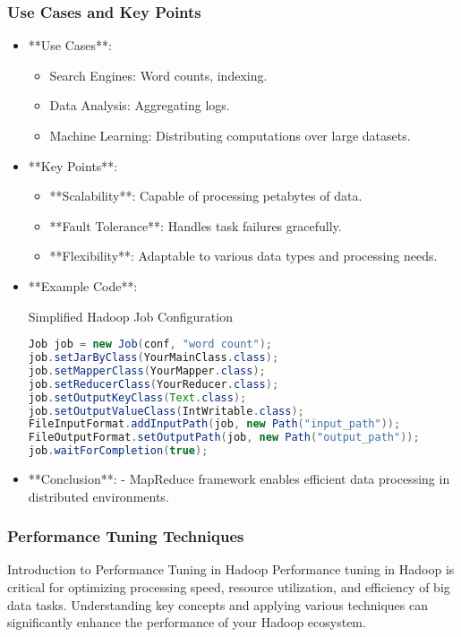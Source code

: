 \documentclass[aspectratio=169]{beamer}
\begin{document}
\begin{frame}[fragile]
    \frametitle{Use Cases and Key Points}
    \begin{itemize}
        \item **Use Cases**:
        \begin{itemize}
            \item Search Engines: Word counts, indexing.
            \item Data Analysis: Aggregating logs.
            \item Machine Learning: Distributing computations over large datasets.
        \end{itemize}
        \item **Key Points**:
        \begin{itemize}
            \item **Scalability**: Capable of processing petabytes of data.
            \item **Fault Tolerance**: Handles task failures gracefully.
            \item **Flexibility**: Adaptable to various data types and processing needs.
        \end{itemize}
        \item **Example Code**:
        \begin{block}{Simplified Hadoop Job Configuration}
        \begin{lstlisting}[language=Java]
Job job = new Job(conf, "word count");
job.setJarByClass(YourMainClass.class);
job.setMapperClass(YourMapper.class);
job.setReducerClass(YourReducer.class);
job.setOutputKeyClass(Text.class);
job.setOutputValueClass(IntWritable.class);
FileInputFormat.addInputPath(job, new Path("input_path"));
FileOutputFormat.setOutputPath(job, new Path("output_path"));
job.waitForCompletion(true);
        \end{lstlisting}
        \end{block}
        \item **Conclusion**: 
          - MapReduce framework enables efficient data processing in distributed environments.
    \end{itemize}
\end{frame}

\begin{frame}[fragile]
    \frametitle{Performance Tuning Techniques}
    \begin{block}{Introduction to Performance Tuning in Hadoop}
        Performance tuning in Hadoop is critical for optimizing processing speed, resource utilization, and efficiency of big data tasks. Understanding key concepts and applying various techniques can significantly enhance the performance of your Hadoop ecosystem.
    \end{block}
\end{frame}
\end{document}
